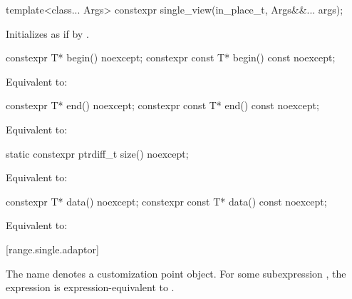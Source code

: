 %
\begin{itemdecl}
template<class... Args>
constexpr single_view(in_place_t, Args&&... args);
\end{itemdecl}

\begin{itemdescr}
\pnum
\effects Initializes  as if by
.
\end{itemdescr}

%
\begin{itemdecl}
constexpr T* begin() noexcept;
constexpr const T* begin() const noexcept;
\end{itemdecl}

\begin{itemdescr}
\pnum
\effects Equivalent to: 
\end{itemdescr}

%
\begin{itemdecl}
constexpr T* end() noexcept;
constexpr const T* end() const noexcept;
\end{itemdecl}

\begin{itemdescr}
\pnum
\effects Equivalent to: 
\end{itemdescr}

%
\begin{itemdecl}
static constexpr ptrdiff_t size() noexcept;
\end{itemdecl}

\begin{itemdescr}
\pnum
\effects Equivalent to: 
\end{itemdescr}

%
\begin{itemdecl}
constexpr T* data() noexcept;
constexpr const T* data() const noexcept;
\end{itemdecl}

\begin{itemdescr}
\pnum
\effects Equivalent to: 
\end{itemdescr}

[range.single.adaptor]{}

\pnum
The name  denotes a
customization point object.
For some subexpression , the expression
 is expression-equivalent to
.

